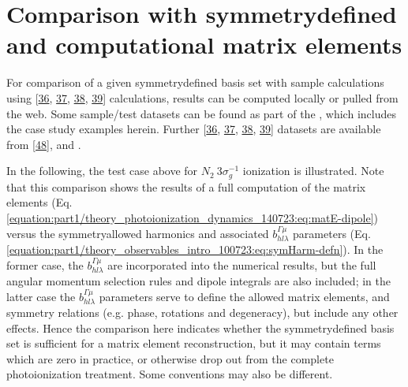 \documentclass[letterpaper,table,10pt,english]{jupyterBook}
\begin{document}
\section{Comparison with symmetry\sphinxhyphen{}defined and computational matrix elements}
\label{\detokenize{part2/sym-fitting-intro_240723:comparison-with-symmetry-defined-and-computational-matrix-elements}}\label{\detokenize{part2/sym-fitting-intro_240723:sec-basis-sets-comparison-with-abinitio}}
\sphinxAtStartPar
For comparison of a given symmetry\sphinxhyphen{}defined basis set with sample  calculations using  {[}\hyperlink{cite.backmatter/bibliography:id764}{36}, \hyperlink{cite.backmatter/bibliography:id628}{37}, \hyperlink{cite.backmatter/bibliography:id805}{38}, \hyperlink{cite.backmatter/bibliography:id767}{39}{]} calculations, results can be computed locally or pulled from the web. Some sample/test datasets can be found as part of the , which includes the case study examples herein. Further  {[}\hyperlink{cite.backmatter/bibliography:id764}{36}, \hyperlink{cite.backmatter/bibliography:id628}{37}, \hyperlink{cite.backmatter/bibliography:id805}{38}, \hyperlink{cite.backmatter/bibliography:id767}{39}{]} datasets are available from  {[}\hyperlink{cite.backmatter/bibliography:id679}{48}{]}, and .

\sphinxAtStartPar
In the following, the test case above for \(N_2~3\sigma_g^{-1}\) ionization is illustrated. Note that this comparison shows the results of a full  computation of the matrix elements (Eq. \eqref{equation:part1/theory_photoionization_dynamics_140723:eq:matE-dipole}) versus the symmetry\sphinxhyphen{}allowed harmonics and associated \(b_{hl\lambda}^{\Gamma\mu}\) parameters (Eq. \eqref{equation:part1/theory_observables_intro_100723:eq:symHarm-defn}). In the former case, the \(b_{hl\lambda}^{\Gamma\mu}\) are incorporated into the numerical results, but the full angular momentum selection rules and dipole integrals are also included; in the latter case the \(b_{hl\lambda}^{\Gamma\mu}\) parameters serve to define the allowed matrix elements, and symmetry relations (e.g. phase, rotations and degeneracy), but  include any other effects. Hence the comparison here indicates whether the symmetry\sphinxhyphen{}defined basis set is sufficient for a matrix element reconstruction, but it may contain terms which are zero in practice, or otherwise drop out from the complete photoionization treatment. Some conventions may also be different.
\end{document}
